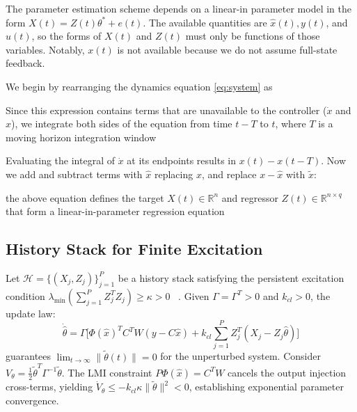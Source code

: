 \documentclass[letterpaper, 10 pt, conference]{ieeeconf}  %
\begin{document}
The parameter estimation scheme depends on a linear-in parameter model in the form $X(t) = Z(t)\theta^* + e(t)$. The available quantities are $\hat x(t), y(t)$, and $u(t)$, so the forms of $X(t)$ and $Z(t)$ must only be functions of those variables. Notably, $x(t)$ is not available because we do not assume full-state feedback.

We begin by rearranging the dynamics equation \eqref{eq:system} as 

Since this expression contains terms that are unavailable to the controller ($\dot x$ and $x$), we integrate both sides of the equation from time $t-T$ to $t$, where $T$ is a moving horizon integration window  

Evaluating the integral of $\dot x$ at its endpoints results in $x(t) - x(t-T)$. Now we add and subtract terms with $\hat x$ replacing $x$, and replace $x - \hat x$ with $\tilde x$: 

the above equation defines the target $X(t) \in \mathbb{R}^n$ and regressor $Z(t) \in \mathbb{R}^{n \times q}$ that form a linear-in-parameter regression equation 

\subsection{History Stack for Finite Excitation}

Let $\mathcal{H} = \{(X_j, Z_j)\}_{j=1}^P$ be a history stack satisfying the persistent excitation condition $\lambda_{\min}(\sum_{j=1}^P Z_j^T Z_j) \ge \kappa > 0$ ~\cite{chowdhary2010concurrent}. Given $\Gamma = \Gamma^T > 0$ and $k_{cl} > 0$, the update law:
\begin{equation}
\dot{\hat{\theta}} = \Gamma \Bigg[ \Phi(\hat{x})^T C^T W (y - C\hat{x}) + k_{cl} \sum_{j=1}^P Z_j^T (X_j - Z_j\hat{\theta}) \Bigg]
\end{equation}
guarantees $\lim_{t \to \infty} \|\tilde{\theta}(t)\| = 0$ for the unperturbed system.
Consider $V_\theta = \frac{1}{2}\tilde{\theta}^T \Gamma^{-1} \tilde{\theta}$. The LMI constraint $P\Phi(\hat{x}) = C^T W$ cancels the output injection cross-terms, yielding $\dot{V}_\theta \le -k_{cl} \kappa \|\tilde{\theta}\|^2 < 0$, establishing exponential parameter convergence.
\end{document}
